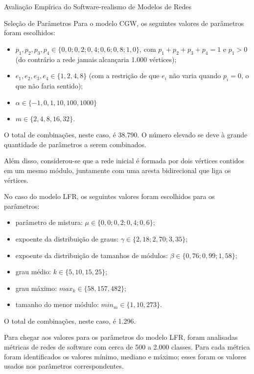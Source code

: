\begin{section}{Avaliação Empírica do Software-realismo de Modelos de Redes}
\begin{subsection}{Seleção de Parâmetros}
Para o modelo CGW, os seguintes valores de parâmetros foram escolhidos:

\begin{itemize}
	\item $p_1, p_2, p_3, p_4 \in \{0,0; 0,2; 0,4; 0,6; 0,8; 1,0\}$, com $p_1 + p_2 + p_3 + p_4 = 1$ e $p_1 > 0$ (do contrário a rede jamais alcançaria 1.000 vértices);
	\item $e_1, e_2, e_3, e_4 \in \{1, 2, 4, 8\}$ (com a restrição de que $e_i$ não varia quando $p_i = 0$, o que não faria sentido);
	\item $\alpha \in \{-1, 0, 1, 10, 100, 1000\}$
	\item $m \in \{2, 4, 8, 16, 32\}$.
\end{itemize}

O total de combinações, neste caso, é 38.790. O número elevado se deve à grande quantidade de parâmetros a serem combinados.

Além disso, considerou-se que a rede inicial é formada por dois vértices contidos em um mesmo módulo, juntamente com uma aresta bidirecional que liga os vértices.

No caso do modelo LFR, os seguintes valores foram escolhidos para os parâmetros:

\begin{itemize}
	\item parâmetro de mistura: $\mu \in \{0,0; 0,2; 0,4; 0,6\}$;
	\item expoente da distribuição de graus: $\gamma \in \{2,18; 2,70; 3,35\}$;
	\item expoente da distribuição de tamanhos de módulos: $\beta \in \{0,76; 0,99; 1,58\}$;
	\item grau médio: $k \in \{5, 10, 15, 25\}$;
	\item grau máximo: $max_k \in \{58, 157, 482\}$;
	\item tamanho do menor módulo: $min_m \in \{1, 10, 273\}$.
\end{itemize}

O total de combinações, neste caso, é 1.296.

Para chegar aos valores para os parâmetros do modelo LFR, foram analisadas métricas de redes de software com cerca de 500 a 2.000 classes. Para cada métrica foram identificados os valores mínimo, mediano e máximo; esses foram os valores usados nos parâmetros correspondentes.



\end{subsection}
\end{section}
